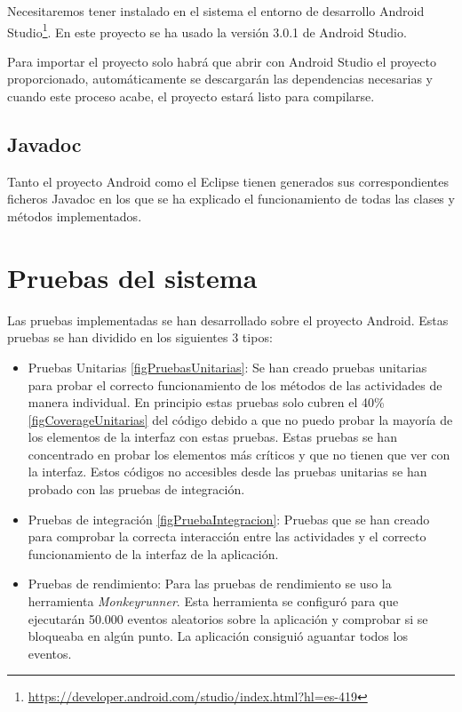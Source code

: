 Necesitaremos tener instalado en el sistema el entorno de desarrollo Android Studio\footnote{\url{https://developer.android.com/studio/index.html?hl=es-419}}. En este proyecto se ha usado la versión 3.0.1 de Android Studio.

Para importar el proyecto solo habrá que abrir con Android Studio el proyecto proporcionado, automáticamente se descargarán las dependencias necesarias y cuando este proceso acabe, el proyecto estará listo para compilarse.

\subsection{Javadoc}

Tanto el proyecto Android como el Eclipse tienen generados sus correspondientes ficheros Javadoc en los que se ha explicado el funcionamiento de todas las clases y métodos implementados.

\section{Pruebas del sistema}

Las pruebas implementadas se han desarrollado sobre el proyecto Android. Estas pruebas se han dividido en los siguientes 3 tipos:

\begin{itemize}
	\item Pruebas Unitarias \ref{figPruebasUnitarias}: Se han creado pruebas unitarias para probar el correcto funcionamiento de los métodos de las actividades de manera individual. En principio estas pruebas solo cubren el 40\% \ref{figCoverageUnitarias} del código debido a que no puedo probar la mayoría de los elementos de la interfaz con estas pruebas. Estas pruebas se han concentrado en probar los elementos más críticos y que no tienen que ver con la interfaz. Estos códigos no accesibles desde las pruebas unitarias se han probado con las pruebas de integración.
	\item Pruebas de integración \ref{figPruebaIntegracion}: Pruebas que se han creado para comprobar la correcta interacción entre las actividades y el correcto funcionamiento de la interfaz de la aplicación.
	\item Pruebas de rendimiento: Para las pruebas de rendimiento se uso la herramienta \textit{Monkeyrunner}. Esta herramienta se configuró para que ejecutarán 50.000 eventos aleatorios sobre la aplicación y comprobar si se bloqueaba en algún punto. La aplicación consiguió aguantar todos los eventos.
\end{itemize}


